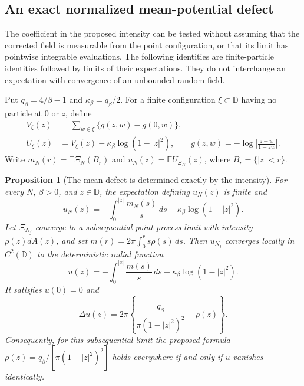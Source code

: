 \documentclass[11pt,a4paper]{article}
\numberwithin{equation}{section}
\newtheorem{proposition}[theorem]{Proposition}
\theoremstyle{definition}
\theoremstyle{remark}
\newcommand{\D}{\mathbb D}
\begin{document}
\subsection{An exact normalized mean-potential defect}
\label{subsec:intensity-mean-potential-defect}

The coefficient in the proposed intensity can be tested without assuming
that the corrected field is measurable from the point configuration, or
that its limit has pointwise integrable evaluations.  The following
identities are finite-particle identities followed by limits of their
expectations.  They do not interchange an expectation with convergence
of an unbounded random field.

Put $q_\beta=4/\beta-1$ and $\kappa_\beta=q_\beta/2$.  For a finite
configuration $\xi\subset\D$ having no particle at $0$ or $z$, define
\begin{align*}
 V_\xi(z)&=\sum_{w\in\xi}\{g(z,w)-g(0,w)\},\\
 U_\xi(z)&=V_\xi(z)-\kappa_\beta\log(1-|z|^2),\qquad
 g(z,w)=-\log\left|\frac{z-w}{1-z\bar w}\right|.
\end{align*}
Write $m_N(r)=\mathbb E\Xi_N(B_r)$ and
$u_N(z)=\mathbb E U_{\Xi_N}(z)$, where $B_r=\{|z|<r\}$.

\begin{proposition}[The mean defect is determined exactly by the intensity]
\label{prop:intensity-mean-potential-defect}
For every $N$, $\beta>0$, and $z\in\D$, the expectation defining
$u_N(z)$ is finite and
\begin{equation}
 u_N(z)=-\int_0^{|z|}\frac{m_N(s)}s\,ds
            -\kappa_\beta\log(1-|z|^2).
 \label{eq:finite-intensity-mean-defect}
\end{equation}
Let $\Xi_{N_j}$ converge to a subsequential point-process limit with
intensity $\rho(z)dA(z)$, and set
$m(r)=2\pi\int_0^r s\rho(s)\,ds$.  Then $u_{N_j}$ converges locally
in $C^2(\D)$ to the deterministic radial function
\begin{equation}
 u(z)=-\int_0^{|z|}\frac{m(s)}s\,ds
            -\kappa_\beta\log(1-|z|^2).
 \label{eq:limiting-intensity-mean-defect}
\end{equation}
It satisfies $u(0)=0$ and
\begin{equation}
 \Delta u(z)=2\pi\left\{
       \frac{q_\beta}{\pi(1-|z|^2)^2}-\rho(z)\right\}.
 \label{eq:intensity-exact-poisson-defect}
\end{equation}
Consequently, for this subsequential limit the proposed formula
$\rho(z)=q_\beta/[\pi(1-|z|^2)^2]$ holds everywhere if and only if
$u$ vanishes identically.
\end{proposition}
\end{document}
